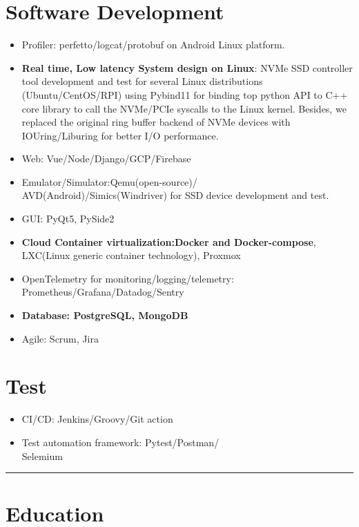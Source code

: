 \documentclass[11pt]{article}
\begin{document}
\begin{multicols*}{2}
\section*{Software Development}\label{software-dev}
\begin{itemize}[noitemsep]
    \item Profiler: perfetto/logcat/protobuf on Android Linux platform.
    \item \textbf{Real time, Low latency System design on Linux}: NVMe SSD controller tool development and test for several Linux distributions (Ubuntu/CentOS/RPI) using Pybind11 for binding top python API to C++ core library to call the NVMe/PCIe syscalls to the Linux kernel. Besides, we replaced the original ring buffer backend of  NVMe devices with IOUring/Liburing for better I/O performance.
    \item Web: Vue/Node/Django/GCP/Firebase
    \item Emulator/Simulator:Qemu(open-source)/\\AVD(Android)/Simics(Windriver) for SSD device development and test.
    \item GUI: PyQt5, PySide2
    \item \textbf{Cloud Container virtualization:Docker and Docker-compose}, LXC(Linux generic container technology), Proxmox
    \item OpenTelemetry for monitoring/logging/telemetry:\\ Prometheus/Grafana/Datadog/Sentry
    \item \textbf{Database: PostgreSQL, MongoDB}
    \item Agile: Scrum, Jira
\end{itemize}

\section*{Test}
\begin{itemize}[noitemsep]
    \item CI/CD: Jenkins/Groovy/Git action
    \item Test automation framework: Pytest/Postman/\\Selemium
\end{itemize}

\hrule

\section*{Education}


\end{multicols*}
\end{document}
